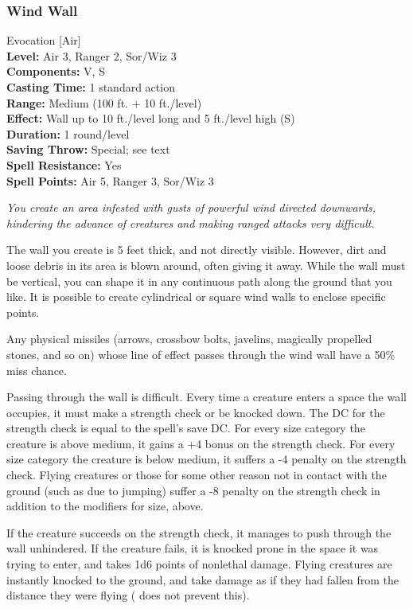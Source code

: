 \subsubsection{Wind Wall}
\label{Spell:WindWall}
Evocation [Air]
\\ \textbf{Level:} Air 3, Ranger 2, Sor/Wiz 3
\\ \textbf{Components:} V, S
\\ \textbf{Casting Time:} 1 standard action
\\ \textbf{Range:} Medium (100 ft. + 10 ft./level)
\\ \textbf{Effect:} Wall up to 10 ft./level long and 5 ft./level high (S)
\\ \textbf{Duration:} 1 round/level
\\ \textbf{Saving Throw:} Special; see text
\\ \textbf{Spell Resistance:} Yes
\\ \textbf{Spell Points:} Air 5, Ranger 3, Sor/Wiz 3

\emph{You create an area infested with gusts of powerful wind directed downwards, hindering the advance of creatures and making ranged attacks very difficult.}

The wall you create is 5 feet thick, and not directly visible. However, dirt and loose
debris in its area is blown around, often giving it away. While the wall must be vertical, 
you can shape it in any continuous path along the ground that you like. 
It is possible to create cylindrical or square wind walls to enclose specific points.

Any physical missiles (arrows, crossbow bolts, javelins, magically propelled stones, and so on) whose line of effect passes through the
wind wall have a 50\% miss chance.

Passing through the wall is difficult.
Every time a creature enters a space the wall occupies, it must make a strength check or be knocked down.
The DC for the strength check is equal to the spell's save DC. 
For every size category the creature is above medium, it gains a +4 bonus on the strength check.
For every size category the creature is below medium, it suffers a -4 penalty on the strength check.
Flying creatures or those for some other reason not in contact with the ground (such as due to jumping) 
suffer a -8 penalty on the strength check in addition to the modifiers for size, above.

If the creature succeeds on the strength check, it manages to push through the wall unhindered.
If the creature fails, it is knocked prone in the space it was trying to enter, and takes 1d6 points of nonlethal damage.
Flying creatures are instantly knocked to the ground, and take damage as if they had fallen from the distance they were
flying ( does not prevent this).

